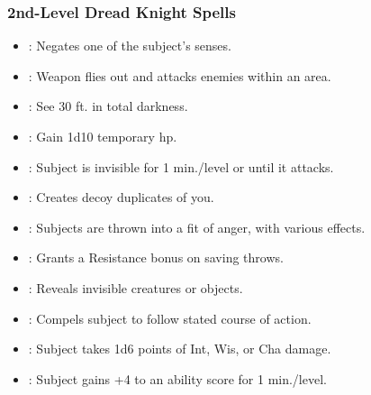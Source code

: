 \subsubsection{2nd-Level Dread Knight Spells}
\begin{itemize}
\item {}: Negates one of the subject's senses.
\item {}: Weapon flies out and attacks enemies within an area.
\item {}: See 30 ft. in total darkness.
\item {}: Gain 1d10 temporary hp.
\item {}: Subject is invisible for 1 min./level or until it attacks.
\item {}: Creates decoy duplicates of you.
\item {}: Subjects are thrown into a fit of anger, with various effects.
\item {}: Grants a Resistance bonus on saving throws.
\item {}: Reveals invisible creatures or objects.
\item {}: Compels subject to follow stated course of action.
\item {}: Subject takes 1d6 points of Int, Wis, or Cha damage.
\item {}: Subject gains +4 to an ability score for 1 min./level.
\end{itemize}
